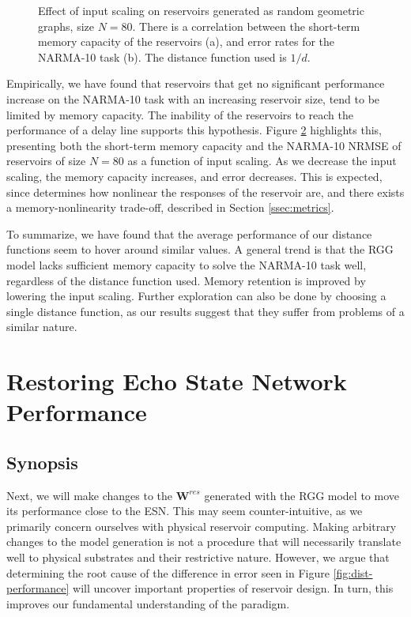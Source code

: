 \begin{figure}[t]
\begin{subfigure}{.49\textwidth}
    \caption{}
    \label{fig:dist-performance-is-b}
  \end{subfigure}
  \caption{
    Effect of input scaling on reservoirs generated as random geometric graphs,
size $N = 80$. There is a correlation between the short-term memory capacity of
the reservoirs (a), and error rates for the NARMA-10 task (b). The distance
function used is $1/d$.
  }
  \label{fig:dist-performance-is}
\end{figure}

Empirically, we have found that reservoirs that get no significant performance
increase on the NARMA-10 task with an increasing reservoir size, tend to be
limited by memory capacity. The inability of the reservoirs to reach the
performance of a delay line supports this hypothesis. Figure
\ref{fig:dist-performance-is} highlights this, presenting both the short-term
memory capacity and the NARMA-10 NRMSE of reservoirs of size $N = 80$ as a
function of input scaling. As we decrease the input scaling, the memory capacity
increases, and error decreases. This is expected, since determines how nonlinear
the responses of the reservoir are, and there exists a memory-nonlinearity
trade-off, described in Section \ref{ssec:metrics}.

To summarize, we have found that the average performance of our distance
functions seem to hover around similar values. A general trend is that the RGG
model lacks sufficient memory capacity to solve the NARMA-10 task well,
regardless of the distance function used. Memory retention is improved by
lowering the input scaling. Further exploration can also be done by choosing a
single distance function, as our results suggest that they suffer from problems
of a similar nature.


\section{Restoring Echo State Network Performance}

\subsection{Synopsis}

Next, we will make changes to the $\mathbf{W}^{res}$ generated with the RGG
model to move its performance close to the ESN. This may seem counter-intuitive,
as we primarily concern ourselves with physical reservoir computing. Making
arbitrary changes to the model generation is not a procedure that will
necessarily translate well to physical substrates and their restrictive
nature. However, we argue that determining the root cause of the difference in
error seen in Figure \ref{fig:dist-performance} will uncover important
properties of reservoir design. In turn, this improves our fundamental
understanding of the paradigm.

